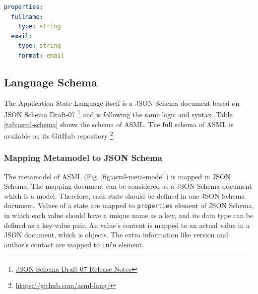 \lstset{
  label=lis:yaml-simple, caption=Example of expressing JSON Schema in YAML syntax., 
}
\begin{lstlisting}[language=yaml]
properties:
  fullname:
    type: string
  email:
    type: string
    format: email
\end{lstlisting}


\subsection{Language Schema}
The Application State Language itself is a JSON Schema document based on JSON Schema Draft-07
\footnote{\href{https://json-schema.org/draft-07/json-schema-release-notes.html}{JSON Schema Draft-07 Release Notes}}
and is following the same logic and syntax. Table \ref{tab:asml-schema} shows the schema of ASML. 
The full schema of ASML is available on its GitHub repository
\footnote{\href{https://github.com/asml-lang/asml/blob/master/schemas/schema.json}{https://github.com/asml-lang/}}.

\subsubsection{Mapping Metamodel to JSON Schema}
The metamodel of ASML (Fig. \ref{fig:asml-meta-model}) is mapped in JSON Schema. The mapping document can be considered as a JSON Schema document which is a model. Therefore, each state should be defined in one JSON Schema document. Values of a state are mapped to \lstinline[basicstyle=\ttfamily]{properties} element of JSON Schema, in which each value should have a unique name as a key, and its data type can be defined as a key-value pair. An value’s content is mapped to an actual value in a JSON document, which is objects. The extra information like version and author’s contact are mapped to \lstinline[basicstyle=\ttfamily]{info} element.

